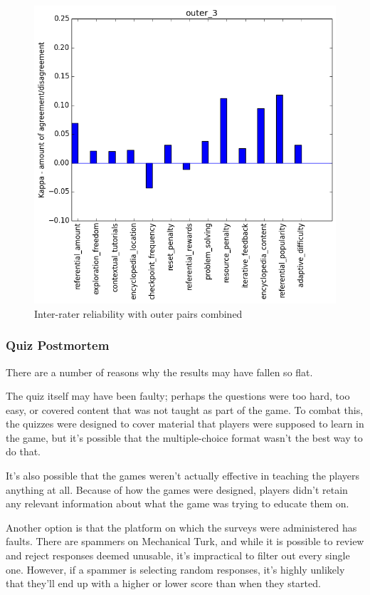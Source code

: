 			\begin{figure}[h] 
				\centering 
				\includegraphics[height=0.33\textheight]{outer_3_stats.png} 
				\caption{Inter-rater reliability with outer pairs combined}
			\end{figure}

		\subsubsection{Quiz Postmortem}
			There are a number of reasons why the results may have fallen so flat.

			The quiz itself may have been faulty; perhaps the questions were too hard, too easy, or covered content that was not taught as part of the game. To combat this, the quizzes were designed to cover material that players were supposed to learn in the game, but it's possible that the multiple-choice format wasn't the best way to do that.

			It's also possible that the games weren't actually effective in teaching the players anything at all. Because of how the games were designed, players didn't retain any relevant information about what the game was trying to educate them on.

			Another option is that the platform on which the surveys were administered has faults. There are spammers on Mechanical Turk, and while it is possible to review and reject responses deemed unusable, it's impractical to filter out every single one. However, if a spammer is selecting random responses, it's highly unlikely that they'll end up with a higher or lower score than when they started. 

